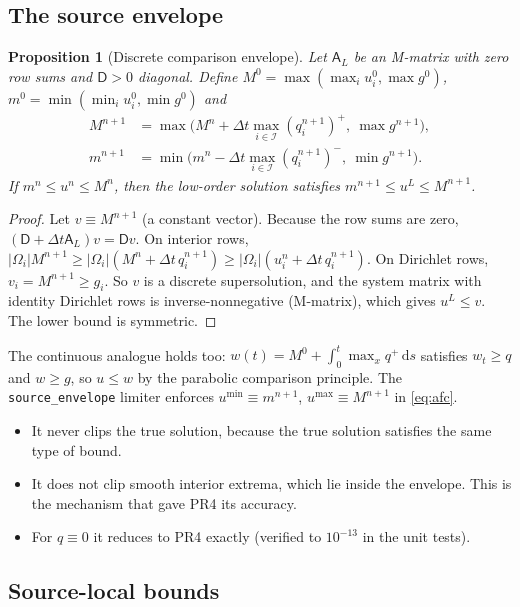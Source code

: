 \documentclass[11pt]{article}
\numberwithin{equation}{section}
\newtheorem{proposition}{Proposition}[section]
\theoremstyle{remark}
\newcommand{\Dm}{\mathsf{D}}
\begin{document}
\subsection{The source envelope}

\begin{proposition}[Discrete comparison envelope]
\label{prop:envelope}
Let $\mathsf A_L$ be an M-matrix with zero row sums and $\Dm>0$ diagonal.
Define $M^0=\max(\max_iu^0_i,\max g^0)$, $m^0=\min(\min_iu^0_i,\min g^0)$ and
\begin{equation}
\begin{aligned}
  M^{n+1}&=\max\Big(M^n+\Delta t\max_{i\in\mathcal I}(q_i^{n+1})^+,\ \max g^{n+1}\Big),\\
  m^{n+1}&=\min\Big(m^n-\Delta t\max_{i\in\mathcal I}(q_i^{n+1})^-,\ \min g^{n+1}\Big).
\end{aligned}
  \label{eq:envelope}
\end{equation}
If $m^n\le u^n\le M^n$, then the low-order solution satisfies
$m^{n+1}\le u^{L}\le M^{n+1}$.
\end{proposition}
\begin{proof}
Let $v\equiv M^{n+1}$ (a constant vector).  Because the row sums are zero,
$(\Dm+\Delta t\mathsf A_L)v=\Dm v$.  On interior rows,
$|\Omega_i|M^{n+1}\ge|\Omega_i|(M^n+\Delta t\,q_i^{n+1})\ge|\Omega_i|(u_i^n+\Delta t\,q_i^{n+1})$.
On Dirichlet rows, $v_i=M^{n+1}\ge g_i$.  So $v$ is a discrete supersolution,
and the system matrix with identity Dirichlet rows is inverse-nonnegative
(M-matrix), which gives $u^L\le v$.  The lower bound is symmetric.
\end{proof}

The continuous analogue holds too: $w(t)=M^0+\int_0^t\max_xq^+\,\mathrm ds$
satisfies $w_t\ge q$ and $w\ge g$, so $u\le w$ by the parabolic comparison
principle.  The \texttt{source\_envelope} limiter enforces
$u^{\min}\equiv m^{n+1}$, $u^{\max}\equiv M^{n+1}$ in \eqref{eq:afc}.
\begin{itemize}[leftmargin=*]
\item It never clips the true solution, because the true solution satisfies
  the same type of bound.
\item It does not clip smooth interior extrema, which lie inside the envelope.
  This is the mechanism that gave PR4 its accuracy.
\item For $q\equiv0$ it reduces to PR4 exactly (verified to $10^{-13}$ in the unit tests).
\end{itemize}

\subsection{Source-local bounds}
\end{document}
